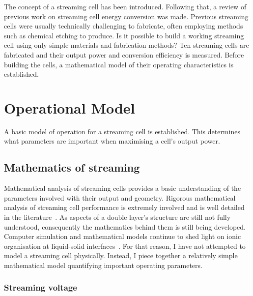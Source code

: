 
The concept of a streaming cell has been introduced.
Following that, a review of previous work on streaming cell energy conversion was made.
Previous streaming cells were usually technically challenging to fabricate, often employing methods such as chemical etching to produce.
Is it possible to build a working streaming cell using only simple materials and fabrication methods?
Ten streaming cells are fabricated and their output power and conversion efficiency is measured.
Before building the cells, a mathematical model of their operating characteristics is established.


\section{Operational Model}


  A basic model of operation for a streaming cell is established.
  This determines what parameters are important when maximising a cell's output power.


  \subsection{Mathematics of streaming}


    Mathematical analysis of streaming cells provides a basic understanding of the parameters involved with their output and geometry.
    Rigorous mathematical analysis of streaming cell performance is extremely involved and is well detailed in the literature~\cite{Yang1998}.
    As aspects of a double layer's structure are still not fully understood, consequently the mathematics behind them is still being developed.
    Computer simulation and mathematical models continue to shed light on ionic organisation at liquid-solid interfaces~\cite{Kornyshev2007}.
    For that reason, I have not attempted to model a streaming cell physically.
    Instead, I piece together a relatively simple mathematical model quantifying important operating parameters.


    \subsubsection*{Streaming voltage}


